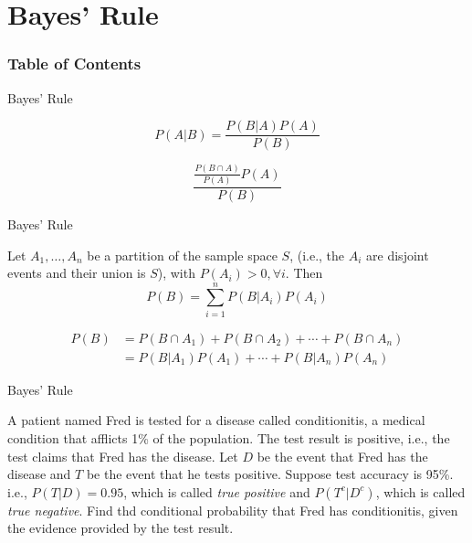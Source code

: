 \documentclass{beamer}
\newcommand{\ti}[1]{\textit{#1}}
\begin{document}
\section{Bayes' Rule}

\begin{frame}
    \frametitle{Table of Contents}
    \tableofcontents[currentsection]
\end{frame}

\begin{frame}{Bayes' Rule}
    \begin{theorem}
        $$P(A|B) = \frac{P(B|A)P(A)}{P(B)}$$
    \end{theorem}
    \[
        \frac{\frac{P(B \cap A)}{P(A)}P(A)}{P(B)}
    \]
\end{frame}

\begin{frame}{Bayes' Rule}
    \begin{theorem}
        Let $A_1,\dots,A_n$ be a partition of the sample space $S$, (i.e., the $A_i$ are disjoint events and their union is $S$), with $P(A_i)>0, \forall i$. Then
        $$P(B)=\sum^n_{i=1}P(B|A_i)P(A_i)$$
    \end{theorem}
    \[
        \begin{aligned}
            P(B) &= P(B \cap A_1) + P(B \cap A_2) + \cdots + P(B \cap A_n)\\
            &=P(B|A_1)P(A_1) + \cdots + P(B|A_n)P(A_n)
        \end{aligned}
    \]
\end{frame}

\begin{frame}{Bayes' Rule}
    \begin{example}
        A patient named Fred is tested for a disease called conditionitis, a medical condition that afflicts 1\% of the population. 
        The test result is positive, i.e., the test claims that Fred has the disease. 
        Let $D$ be the event that Fred has the disease and $T$ be the event that he tests positive.\newline
        Suppose test accuracy is 95\%. 
        i.e., $P(T|D)=0.95$, which is called \ti{true positive} and $P(T^c|D^c)$, which is called \ti{true negative}.\newline
        Find thd conditional probability that Fred has conditionitis, given the evidence provided by the test result.
    \end{example}

\end{frame}
\end{document}
